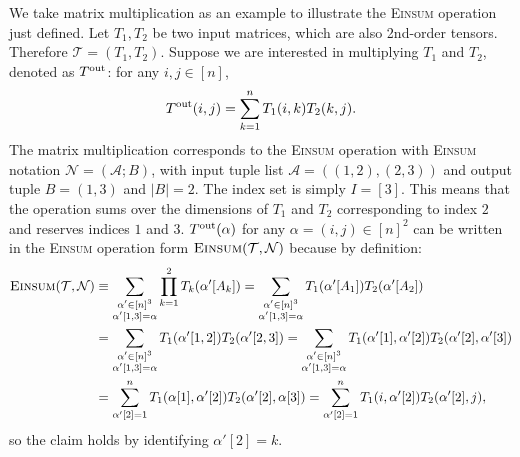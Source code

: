 \documentclass[twoside,11pt]{article}
\def\Einsum{\textsc{Einsum}}
\newcommand{\tensorcontraction}{\textsc{Einsum}}
\def\calN{\mathcal{N}}
\def\calA{\mathcal{A}}
\def\calT{\mathcal{T}}
\begin{document}
\begin{example}
\label{eg:matrix multiplication}
We take matrix multiplication as an example to illustrate the \Einsum{} operation just defined. Let $T_1, T_2$ be two input matrices, which are also 2nd-order tensors. Therefore $\calT = (T_1, T_2)$. Suppose we are interested in multiplying $T_1$ and $T_2$, denoted as $T^{\rm out}$: for any $i, j \in [n]$,
\begin{equation*}
T^{\rm out} (i, j) = \sum_{k = 1}^n T_{1} (i, k) T_{2} (k, j). 
\end{equation*}
The matrix multiplication corresponds to the \Einsum{} operation with \Einsum{} notation $\calN = (\calA; B)$, with input tuple list $\calA = ((1,2),(2,3))$ and output tuple $B = (1,3)$ and $|B| = 2$. The index set is simply $I = [3]$. This means that the operation sums over the dimensions of $T_1$ and $T_2$ corresponding to index $2$ and reserves indices $1$ and $3$. $T^{\rm out} (\alpha)$ for any $\alpha = (i, j) \in  [n]^{2}$ can be written in the \Einsum{} operation form $\tensorcontraction(\calT, \calN)$ because by definition:
\begin{align*}
\tensorcontraction(\calT, \calN) & \equiv \sum_{\substack{\alpha'  \in [n]^3 \\ \alpha' [1, 3] = \alpha}} \prod_{k = 1}^{2} T_k (\alpha' [A_k]) = \sum_{\substack{\alpha' 
\in [n]^3 \\ \alpha' [1, 3] = \alpha}} T_1 (\alpha' [A_1]) T_2 (\alpha' [A_2]) \\
& = \sum_{\substack{\alpha'  \in [n]^3 \\ \alpha' [1, 3] = \alpha}} T_1 (\alpha' [1, 2]) T_2 (\alpha' [2, 3]) = \sum_{\substack{\alpha'  \in [n]^3 \\ \alpha' [1, 3] = \alpha}} T_1 (\alpha' [1], \alpha' [2]) T_2 (\alpha' [2], \alpha'[3]) \\
& = \sum_{\alpha' [2] = 1}^{n} T_{1} (\alpha [1], \alpha' [2]) T_{2} (\alpha' [2], \alpha [3]) = \sum_{\alpha' [2] = 1}^{n} T_{1} (i, \alpha' [2]) T_{2} (\alpha' [2], j),
\end{align*}
so the claim holds by identifying $\alpha' [2] = k$.
\end{example}
\end{document}
